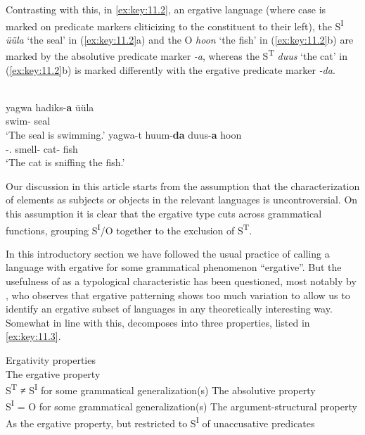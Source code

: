 \documentclass[output=paper]{langsci/langscibook}
\begin{document}
Contrasting with this, in  \eqref{ex:key:11.2}, an
ergative language (where case is marked on predicate markers cliticizing to the
constituent to their left), the S\textsuperscript{I} \emph{üüla} ‘the seal’ in
(\ref{ex:key:11.2}a) and the O \emph{hoon} ‘the fish’ in (\ref{ex:key:11.2}b)
are marked by the absolutive predicate marker \emph{-a}, whereas the
S\textsuperscript{T} \emph{duus} ‘the cat’ in (\ref{ex:key:11.2}b) is marked
differently with the ergative predicate marker \emph{-da}.

\ea%
    \label{ex:key:11.2} {\parencite[32]{Mulder1994}}\\
	\ea
		\gll yagwa  hadiks-\textbf{a}    üüla\\
			\Prs{}    swim-\Abs{}    seal\\
		\glt ‘The seal is swimming.’
	\ex
		\gll yagwa-t    huum-\textbf{da}    duus-\textbf{a}    hoon\\
			\Prs{}-\Tsg.\Sbj{}  smell-\Erg{}    cat-\Abs{}    fish\\
		\glt ‘The cat is sniffing the fish.’
	\z
\z

Our discussion in this article starts from the assumption that the
characterization of elements as subjects or objects in the relevant languages
is uncontroversial. On this assumption it is clear that the ergative 
type cuts across grammatical functions, grouping S\textsuperscript{I}/O
together to the exclusion of S\textsuperscript{T}.

In this introductory section we have followed the usual practice of calling a
language with ergative  for some grammatical phenomenon \enquote{ergative}.
But the usefulness of  as a typological characteristic has been
questioned, most notably by \citet{DeLancey2004}, who observes that ergative
patterning shows too much variation to allow us to identify an ergative subset
of languages in any theoretically interesting way. Somewhat in line with this,
\citet{Deal2015} decomposes  into three  properties, listed
in \eqref{ex:key:11.3}.

\ea%
    \label{ex:key:11.3}Ergativity properties \citep{Deal2015}\\
	\ea The ergative property\\
        S\textsuperscript{T} ≠ S\textsuperscript{I} for some grammatical
        generalization(s)
	\ex The absolutive property\\
        S\textsuperscript{I} = O for some grammatical generalization(s)
	\ex The argument-structural property\\
        As the ergative property, but restricted to S\textsuperscript{I} of
        unaccusative predicates
	\z
\z
\end{document}
